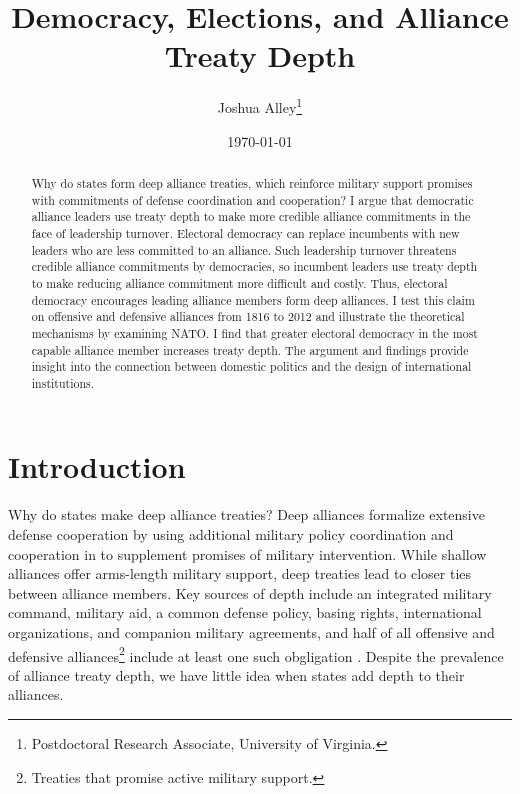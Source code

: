 \documentclass[12pt]{article}
\title{\textbf{Democracy, Elections, and Alliance Treaty Depth}}
\author{Joshua Alley\footnote{Postdoctoral Research Associate,
University of Virginia.}}
\date{\today}
\begin{document}
\maketitle 

\doublespace 

\begin{abstract}
Why do states form deep alliance treaties, which reinforce military support promises with commitments of defense coordination and cooperation? 
I argue that democratic alliance leaders use treaty depth to make more credible alliance commitments in the face of leadership turnover. 
Electoral democracy can replace incumbents with new leaders who are less committed to an alliance. 
Such leadership turnover threatens credible alliance commitments by democracies, so incumbent leaders use treaty depth to make reducing alliance commitment more difficult and costly. 
Thus, electoral democracy encourages leading alliance members form deep alliances.
I test this claim on offensive and defensive alliances from 1816 to 2012 and illustrate the theoretical mechanisms by examining NATO.
I find that greater electoral democracy in the most capable alliance member increases treaty depth. 
The argument and findings provide insight into the connection between domestic politics and the design of international institutions. 
\end{abstract}


\newpage 


\section{Introduction}


Why do states make deep alliance treaties? 
Deep alliances formalize extensive defense cooperation by using additional military policy coordination and cooperation in to supplement promises of military intervention. 
While shallow alliances offer arms-length military support, deep treaties lead to closer ties between alliance members. 
Key sources of depth include an integrated military command, military aid, a common defense policy, basing rights, international organizations, and companion military agreements, and half of all offensive and defensive alliances\footnote{Treaties that promise active military support.} include at least one such obgligation \citep{Leedsetal2002}. 
Despite the prevalence of alliance treaty depth, we have little idea when states add depth to their alliances. 
\end{document}
